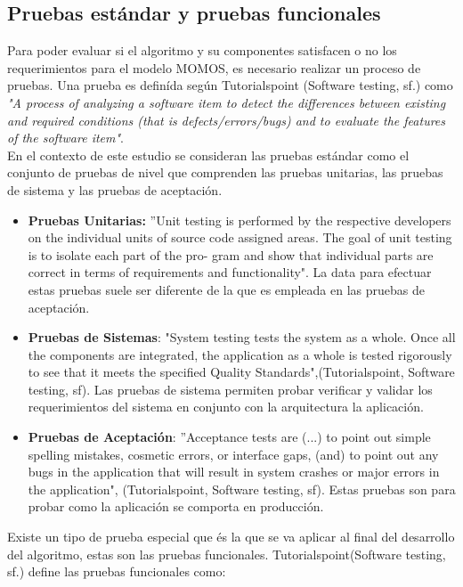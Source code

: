 \subsection{Pruebas estándar y pruebas funcionales}

Para poder evaluar si el algoritmo y su componentes satisfacen o no los requerimientos para el modelo MOMOS, es necesario realizar un proceso de pruebas. Una prueba es definída según Tutorialspoint (Software testing, sf.) como \textit{"A process of analyzing a software item to detect the differences between existing and required conditions (that is defects/errors/bugs) and to evaluate the features of the software item"}.\\

En el contexto de este estudio se consideran las pruebas estándar como el conjunto de pruebas de nivel que comprenden las pruebas unitarias, las pruebas de sistema y las pruebas de aceptación.

\begin{itemize}
	\item \textbf{Pruebas Unitarias:} ”Unit testing is performed by the respective developers on the individual units of source code assigned areas. The goal of unit testing is to isolate each part of the pro- gram and show that individual parts are correct in terms of requirements and functionality". La data para efectuar estas pruebas suele ser diferente de la que es empleada en las pruebas de aceptación.
	\item \textbf{Pruebas de Sistemas}: "System testing tests the system as a whole. Once all the components are integrated, the application as a whole is tested rigorously to see that it meets the specified Quality Standards",(Tutorialspoint, Software testing, sf). Las pruebas de sistema permiten probar verificar y validar los requerimientos del sistema en conjunto con la arquitectura la aplicación.
	\item \textbf{Pruebas de Aceptación}: ”Acceptance tests are (...) to point out simple spelling mistakes, cosmetic errors, or interface gaps, (and) to point out any bugs in the application that will result in system crashes or major errors in the application", (Tutorialspoint, Software testing, sf). Estas pruebas son para probar como la aplicación se comporta en producción.
\end{itemize}

Existe un tipo de prueba especial que és la que se va aplicar al final del desarrollo del algoritmo, estas son las pruebas funcionales. Tutorialspoint(Software testing, sf.) define las pruebas funcionales como:

